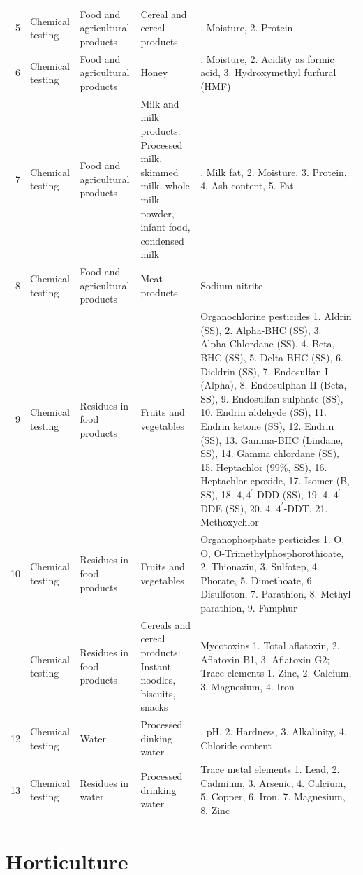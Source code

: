 \documentclass[
  openany]{book}
\begin{document}
\begin{longtable}{r>{\raggedright\arraybackslash}p{8em}>{\raggedright\arraybackslash}p{8em}>{\raggedright\arraybackslash}p{10em}>{\raggedright\arraybackslash}p{22em}}
5 & Chemical testing & Food and agricultural products & Cereal and cereal products & 1. Moisture, 2. Protein\\
\addlinespace
\rowcolor{gray!6}  6 & Chemical testing & Food and agricultural products & Honey & 1. Moisture, 2. Acidity as formic acid, 3. Hydroxymethyl furfural (HMF)\\
7 & Chemical testing & Food and agricultural products & Milk and milk products: Processed milk, skimmed milk, whole milk powder, infant food, condensed milk & 1. Milk fat, 2. Moisture, 3. Protein, 4. Ash content, 5. Fat\\
\rowcolor{gray!6}  8 & Chemical testing & Food and agricultural products & Meat products & Sodium nitrite\\
9 & Chemical testing & Residues in food products & Fruits and vegetables & Organochlorine pesticides 1. Aldrin (SS), 2. Alpha-BHC (SS), 3. Alpha-Chlordane (SS), 4. Beta, BHC (SS), 5. Delta BHC (SS), 6. Dieldrin (SS), 7. Endosulfan I (Alpha), 8. Endosulphan II (Beta, SS), 9. Endosulfan sulphate (SS), 10. Endrin aldehyde (SS), 11. Endrin ketone (SS), 12. Endrin (SS), 13. Gamma-BHC (Lindane, SS), 14. Gamma chlordane (SS), 15. Heptachlor (99\%, SS), 16. Heptachlor-epoxide, 17. Isomer (B, SS), 18. $4, 4^{\prime}$-DDD (SS), 19. 4, $4^{\prime}$-DDE (SS), 20. 4, $4^{\prime}$-DDT, 21. Methoxychlor\\
\rowcolor{gray!6}  10 & Chemical testing & Residues in food products & Fruits and vegetables & Organophosphate pesticides 1. O, O, O-Trimethylphosphorothioate, 2. Thionazin, 3. Sulfotep, 4. Phorate, 5. Dimethoate, 6. Disulfoton, 7. Parathion, 8. Methyl parathion, 9. Famphur\\
\addlinespace
11 & Chemical testing & Residues in food products & Cereals and cereal products: Instant noodles, biscuits, snacks & Mycotoxins 1. Total aflatoxin, 2. Aflatoxin B1, 3. Aflatoxin G2; Trace elements 1. Zinc, 2. Calcium, 3. Magnesium, 4. Iron\\
\rowcolor{gray!6}  12 & Chemical testing & Water & Processed dinking water & 1. pH, 2. Hardness, 3. Alkalinity, 4. Chloride content\\
13 & Chemical testing & Residues in water & Processed drinking water & Trace metal elements 1. Lead, 2. Cadmium, 3. Arsenic, 4. Calcium, 5. Copper, 6. Iron, 7. Magnesium, 8. Zinc\\
\bottomrule
\end{longtable}
\endgroup{}

\hypertarget{horticulture}{%
\chapter{Horticulture}\label{horticulture}}
\end{document}
